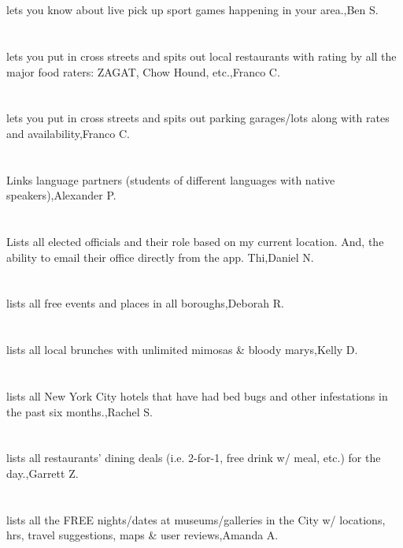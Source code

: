 \section{}lets you know about live pick up sport games happening in your area.,Ben S.	
\section{}lets you put in cross streets and spits out local restaurants with rating by all the major food raters:  ZAGAT, Chow Hound, etc.,Franco C.	
\section{}lets you put in cross streets and spits out parking garages/lots  along with rates and availability,Franco C.	
\section{}Links language partners (students of different languages with native speakers),Alexander P.	
\section{}Lists all elected officials and their role based on my current location. And, the ability to email their office directly from the app.   Thi,Daniel N.	
\section{}lists all free events and places in all boroughs,Deborah R.	
\section{}lists all local brunches with unlimited mimosas \& bloody marys,Kelly D.	
\section{}lists all New York City hotels that have had bed bugs and other infestations in the past six months.,Rachel S.	
\section{}lists all restaurants' dining deals (i.e. 2-for-1, free drink w/ meal, etc.) for the day.,Garrett Z.	
\section{}lists all the FREE nights/dates at museums/galleries in the City w/ locations, hrs, travel suggestions, maps \& user reviews,Amanda A.	
